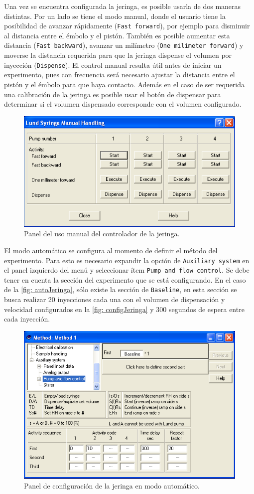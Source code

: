 	Una vez se encuentra configurada la jeringa, es posible usarla de dos maneras distintas. Por un lado se tiene el modo manual, donde el usuario tiene la posibilidad de avanzar rápidamente (\texttt{Fast forward}), por ejemplo para disminuir al distancia entre el émbolo y el pistón. También es posible aumentar esta distancia (\texttt{Fast backward}), avanzar un milímetro (\texttt{One milimeter forward}) y moverse la distancia requerida para que la jeringa dispense el volumen por inyección (\texttt{Dispense}). El control manual resulta útil antes de iniciar un experimento, pues con frecuencia será necesario ajustar la distancia entre el pistón y el émbolo para que haya contacto. Además en el caso de ser requerida una calibración de la jeringa es posible usar el botón de dispensar para determinar si el volumen dispensado corresponde con el volumen configurado.
	\begin{figure}[h]
		\centering
		\includegraphics[width=0.5\linewidth]{Figures/jeringa_manual}
		\caption{Panel del uso manual del controlador de la jeringa.}
		\label{fig: manualJeringa}
	\end{figure}

	El modo automático se configura al momento de definir el método del experimento. Para esto es necesario expandir la opción de \texttt{Auxiliary system} en el panel izquierdo del menú y seleccionar ítem \texttt{Pump and flow control}. Se debe tener en cuenta la sección del experimento que se está configurando. En el caso de la \autoref{fig: autoJeringa}, sólo existe la sección de \texttt{Baseline}, en esta sección se busca realizar 20 inyecciones cada una con el volumen de dispensación y velocidad configurados en la \autoref{fig: configJeringa} y 300 segundos de espera entre cada inyección.
	\begin{figure}[h]
		\centering
		\includegraphics[width=0.5\linewidth]{Figures/jeringa_experimento}
		\caption{Panel de configuración de la jeringa en modo automático.}
		\label{fig: autoJeringa}
	\end{figure}
	
